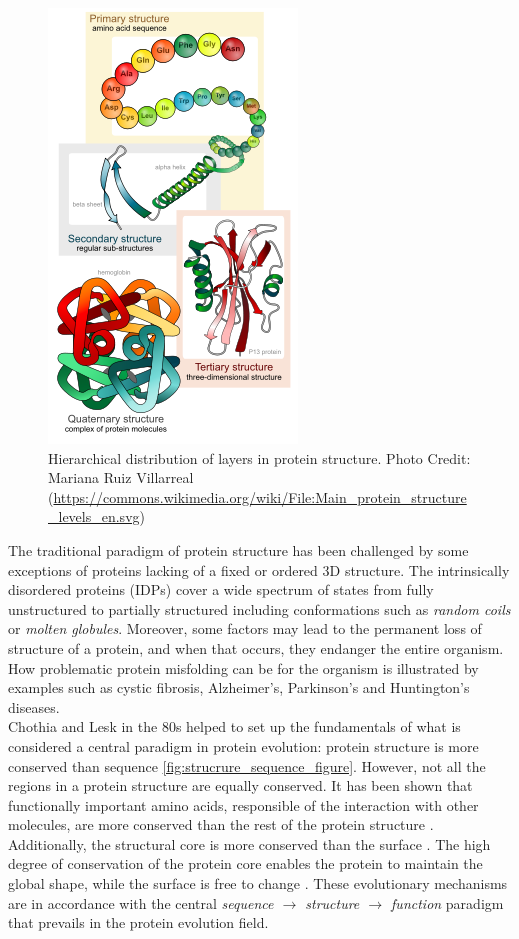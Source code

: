 \documentclass[11pt, b5paper,twoside]{tesi_upf}
\begin{document}
\begin{figure}[htbp]

  \centering
  	\includegraphics[scale=0.5]{../figures/protein_structure_levels_en.png} %

	\caption[Hierarchical distribution of layers in protein structure.]{Hierarchical distribution of layers in protein structure. Photo Credit: Mariana Ruiz Villarreal (\url{https://commons.wikimedia.org/wiki/File:Main_protein_structure_levels_en.svg})}
	\label{fig:hierarchy_figure}
\end{figure}
\par The traditional paradigm of protein structure has been challenged by some exceptions of proteins lacking of a fixed or ordered 3D structure. The intrinsically disordered proteins (IDPs) cover a wide spectrum of states from fully unstructured to partially structured including conformations such as \textit{random coils} or \textit{molten globules}. Moreover, some  factors may lead to the permanent loss of structure of a protein, and when that occurs, they endanger the entire organism. How problematic protein misfolding can be for the organism is illustrated by examples such as cystic fibrosis, Alzheimer's, Parkinson's and Huntington's diseases. \\
Chothia and Lesk in the 80s \cite{StructureSequence} helped to set up the fundamentals of what is considered a central paradigm in protein evolution: protein structure is more conserved than sequence \ref{fig:strucrure_sequence_figure}. However, not all the regions in a protein structure are equally conserved. It has been shown that functionally important amino acids, responsible of the interaction with other molecules, are more conserved than the rest of the protein structure \cite{conservPPI}. Additionally, the structural core is more conserved than the surface \cite{Raj2007}. The high degree of conservation of the protein core enables the protein to maintain the global shape, while the surface is free to change \cite{Todd2001}. These evolutionary mechanisms are in accordance with the central \textit{sequence $\rightarrow$ structure $\rightarrow$ function} paradigm that prevails in the protein evolution field. 
\end{document}
